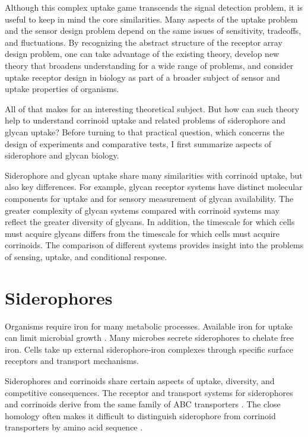 \documentclass[\mydocfontsize]{article}
\begin{document}
\begin{multicols}{2}
Although this complex uptake game transcends the signal detection problem, it is useful to keep in mind the core similarities. Many aspects of the uptake problem and the sensor design problem depend on the same issues of sensitivity, tradeoffs, and fluctuations. By recognizing the abstract structure of the receptor array design problem, one can take advantage of the existing theory, develop new theory that broadens understanding for a wide range of problems, and consider uptake receptor design in biology as part of a broader subject of sensor and uptake properties of organisms. 

All of that makes for an interesting theoretical subject. But how can such theory help to understand corrinoid uptake and related problems of siderophore and glycan uptake? Before turning to that practical question, which concerns the design of experiments and comparative tests, I first summarize aspects of siderophore and glycan biology. 

Siderophore and glycan uptake share many similarities with corrinoid uptake, but also key differences. For example, glycan receptor systems have distinct molecular components for uptake and for sensory measurement of glycan availability. The greater complexity of glycan systems compared with corrinoid systems may reflect the greater diversity of glycans. In addition, the timescale for which cells must acquire glycans differs from the timescale for which cells must acquire corrinoids. The comparison of different systems provides insight into the problems of sensing, uptake, and conditional response.

\section{Siderophores}

Organisms require iron for many metabolic processes. Available iron for uptake can limit microbial growth \autocite{cornelis10ironb}. Many microbes secrete siderophores to chelate free iron. Cells take up external siderophore-iron complexes through specific surface receptors and transport mechanisms. 

Siderophores and corrinoids share certain aspects of uptake, diversity, and competitive consequences. The receptor and transport systems for siderophores and corrinoids derive from the same family of ABC transporters \autocite{cracan13metallomics}. The close homology often makes it difficult to distinguish siderophore from corrinoid transporters by amino acid sequence \autocite{yi12versatility}. 


\end{multicols}
\end{document}
